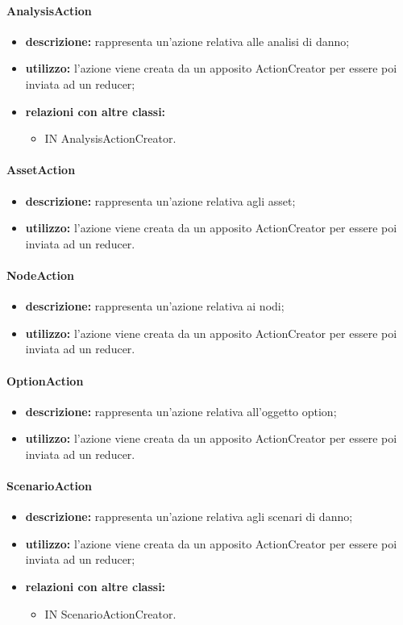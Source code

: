 \paragraph{AnalysisAction}
\begin{itemize}
	\item \textbf{descrizione:} rappresenta un'azione relativa alle analisi di danno;
	\item \textbf{utilizzo:} l'azione viene creata da un apposito ActionCreator per essere poi inviata ad un reducer;
	\item \textbf{relazioni con altre classi:} 
	\begin{itemize}
		\item IN AnalysisActionCreator.
	\end{itemize}
\end{itemize}
\paragraph{AssetAction}
\begin{itemize}
	\item \textbf{descrizione:} rappresenta un'azione relativa agli asset;
	\item \textbf{utilizzo:} l'azione viene creata da un apposito ActionCreator per essere poi inviata ad un reducer.
\end{itemize}
\paragraph{NodeAction}
\begin{itemize}
	\item \textbf{descrizione:} rappresenta un'azione relativa ai nodi;
	\item \textbf{utilizzo:} l'azione viene creata da un apposito ActionCreator per essere poi inviata ad un reducer.
\end{itemize}
\paragraph{OptionAction}
\begin{itemize}
	\item \textbf{descrizione:} rappresenta un'azione relativa all'oggetto option;
	\item \textbf{utilizzo:} l'azione viene creata da un apposito ActionCreator per essere poi inviata ad un reducer.
\end{itemize}
\paragraph{ScenarioAction}
\begin{itemize}
	\item \textbf{descrizione:} rappresenta un'azione relativa agli scenari di danno;
	\item \textbf{utilizzo:} l'azione viene creata da un apposito ActionCreator per essere poi inviata ad un reducer;
	\item \textbf{relazioni con altre classi:} 
	\begin{itemize}
		\item IN ScenarioActionCreator.
	\end{itemize}
\end{itemize}
\newpage
